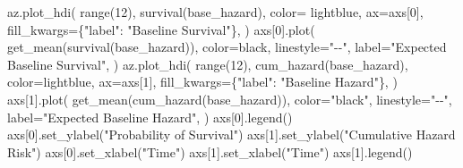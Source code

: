 \documentclass[
  letterpaper,
  DIV=11,
  numbers=noendperiod]{scrartcl}
\newenvironment{Shaded}{\begin{snugshade}}{\end{snugshade}}
\newcommand{\BuiltInTok}[1]{\textcolor[rgb]{0.00,0.23,0.31}{#1}}
\newcommand{\DecValTok}[1]{\textcolor[rgb]{0.68,0.00,0.00}{#1}}
\newcommand{\NormalTok}[1]{\textcolor[rgb]{0.00,0.23,0.31}{#1}}
\newcommand{\OperatorTok}[1]{\textcolor[rgb]{0.37,0.37,0.37}{#1}}
\newcommand{\StringTok}[1]{\textcolor[rgb]{0.13,0.47,0.30}{#1}}
\begin{document}
\begin{Shaded}
\begin{Highlighting}[]
\NormalTok{    az.plot\_hdi(}
        \BuiltInTok{range}\NormalTok{(}\DecValTok{12}\NormalTok{),}
\NormalTok{        survival(base\_hazard),}
\NormalTok{        color}\OperatorTok{=} \StringTok{\textquotesingle{}lightblue\textquotesingle{}}\NormalTok{,}
\NormalTok{        ax}\OperatorTok{=}\NormalTok{axs[}\DecValTok{0}\NormalTok{],}
\NormalTok{        fill\_kwargs}\OperatorTok{=}\NormalTok{\{}\StringTok{"label"}\NormalTok{: }\StringTok{"Baseline Survival"}\NormalTok{\},}
\NormalTok{    )}
\NormalTok{    axs[}\DecValTok{0}\NormalTok{].plot(}
\NormalTok{        get\_mean(survival(base\_hazard)),}
\NormalTok{        color}\OperatorTok{=}\StringTok{\textquotesingle{}black\textquotesingle{}}\NormalTok{,}
\NormalTok{        linestyle}\OperatorTok{=}\StringTok{"{-}{-}"}\NormalTok{,}
\NormalTok{        label}\OperatorTok{=}\StringTok{"Expected Baseline Survival"}\NormalTok{,}
\NormalTok{    )}
\NormalTok{    az.plot\_hdi(}
        \BuiltInTok{range}\NormalTok{(}\DecValTok{12}\NormalTok{),}
\NormalTok{        cum\_hazard(base\_hazard),}
\NormalTok{        color}\OperatorTok{=}\StringTok{\textquotesingle{}lightblue\textquotesingle{}}\NormalTok{,}
\NormalTok{        ax}\OperatorTok{=}\NormalTok{axs[}\DecValTok{1}\NormalTok{],}
\NormalTok{        fill\_kwargs}\OperatorTok{=}\NormalTok{\{}\StringTok{"label"}\NormalTok{: }\StringTok{"Baseline Hazard"}\NormalTok{\},}
\NormalTok{    )}
\NormalTok{    axs[}\DecValTok{1}\NormalTok{].plot(}
\NormalTok{        get\_mean(cum\_hazard(base\_hazard)),}
\NormalTok{        color}\OperatorTok{=}\StringTok{"black"}\NormalTok{,}
\NormalTok{        linestyle}\OperatorTok{=}\StringTok{"{-}{-}"}\NormalTok{,}
\NormalTok{        label}\OperatorTok{=}\StringTok{"Expected Baseline Hazard"}\NormalTok{,}
\NormalTok{    )}
\NormalTok{    axs[}\DecValTok{0}\NormalTok{].legend()}
\NormalTok{    axs[}\DecValTok{0}\NormalTok{].set\_ylabel(}\StringTok{"Probability of Survival"}\NormalTok{)}
\NormalTok{    axs[}\DecValTok{1}\NormalTok{].set\_ylabel(}\StringTok{"Cumulative Hazard Risk"}\NormalTok{)}
\NormalTok{    axs[}\DecValTok{0}\NormalTok{].set\_xlabel(}\StringTok{"Time"}\NormalTok{)}
\NormalTok{    axs[}\DecValTok{1}\NormalTok{].set\_xlabel(}\StringTok{"Time"}\NormalTok{)}
\NormalTok{    axs[}\DecValTok{1}\NormalTok{].legend()}



\end{Highlighting}
\end{Shaded}
\end{document}
